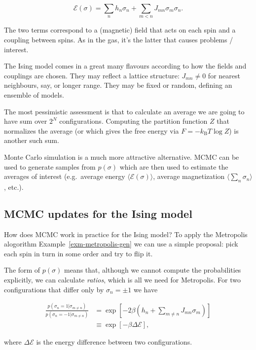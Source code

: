 \documentclass[
  letterpaper,
  DIV=11,
  numbers=noendperiod]{scrreprt}
\theoremstyle{definition}
\theoremstyle{remark}
\begin{document}
\[
\mathcal{E}(\sigma)=\sum_n h_n\sigma_n + \sum_{m<n} J_{mn}\sigma_m\sigma_n.
\]

The two terms correspond to a (magnetic) field that acts on each spin
and a coupling between spins. As in the gas, it's the latter that causes
problems / interest.

The Ising model comes in a great many flavours according to how the
fields and couplings are chosen. They may reflect a lattice structure:
\(J_{mn}\neq 0\) for nearest neighbours, say, or longer range. They may
be fixed or random, defining an ensemble of models.

The most pessimistic assessment is that to calculate an average we are
going to have sum over \(2^N\) configurations. Computing the partition
function \(Z\) that normalizes the average (or which gives the free
energy via \(F=-k_\text{B}T\log Z\)) is another such sum.

Monte Carlo simulation is a much more attractive alternative. MCMC can
be used to generate samples from \(p(\sigma)\) which are then used to
estimate the averages of interest (e.g.~average energy
\(\langle\mathcal{E}(\sigma)\rangle\), average magnetization
\(\langle\sum_n \sigma_n\rangle\), etc.).

\hypertarget{mcmc-updates-for-the-ising-model}{%
\subsection{MCMC updates for the Ising
model}\label{mcmc-updates-for-the-ising-model}}

How does MCMC work in practice for the Ising model? To apply the
Metropolis alogorithm Example~\ref{exm-metropolis-gen} we can use a
simple proposal: pick each spin in turn in some order and try to flip
it.

The form of \(p(\sigma)\) means that, although we cannot compute the
probabilities explicitly, we can calculate \emph{ratios}, which is all
we need for Metropolis. For two configurations that differ only by
\(\sigma_n=\pm 1\) we have

\[
\begin{align}
\frac{p(\sigma_n=1|\sigma_{m\neq n})}{p(\sigma_n=-1|\sigma_{m\neq n})} &= \exp\left[-2\beta \left(h_n+\sum_{m\neq n} J_{mn}\sigma_m\right)\right]\\
&\equiv \exp\left[-\beta\Delta \mathcal{E}\right],
\end{align}
\]

where \(\Delta \mathcal{E}\) is the energy difference between two
configurations.
\end{document}
